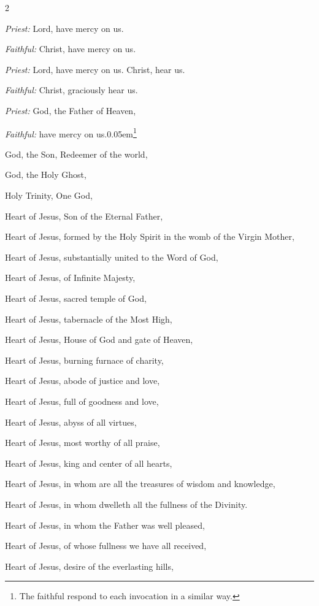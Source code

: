\begin{enpars}
\begin{multicols}{2}
\raggedcolumns 

\textit{Priest:}  Lord, have mercy on us.

\textit{Faithful:} Christ, have mercy on us.

\textit{Priest:}  Lord, have mercy on us. Christ, hear us.

\textit{Faithful:} Christ, graciously hear us.

\textit{Priest:}  God, the Father of Heaven,

\textit{Faithful:} have mercy on us.\kern 0.05em\footnote{\raggedright{The faithful respond to each invocation in a similar way.}\par}

God, the Son, Redeemer of the world,

God, the Holy Ghost,

Holy Trinity, One God,

Heart of Jesus, Son of the Eternal Father,

Heart of Jesus, formed by the Holy Spirit in the womb of the Virgin Mother,

Heart of Jesus, substantially united to the Word of God,

Heart of Jesus, of Infinite Majesty,

Heart of Jesus, sacred temple of God,

Heart of Jesus, tabernacle of the Most High,

Heart of Jesus, House of God and gate of Heaven,

Heart of Jesus, burning furnace of charity,

Heart of Jesus, abode of justice and love,

Heart of Jesus, full of goodness and love,

Heart of Jesus, abyss of all virtues,

Heart of Jesus, most worthy of all praise,

Heart of Jesus, king and center of all hearts,

Heart of Jesus, in whom are all the treasures of wisdom and knowledge,

Heart of Jesus, in whom dwelleth all the fullness of the Divinity.

Heart of Jesus, in whom the Father was well pleased,

Heart of Jesus, of whose fullness we have all received,

Heart of Jesus, desire of the everlasting hills,


\end{multicols}
\end{enpars}
